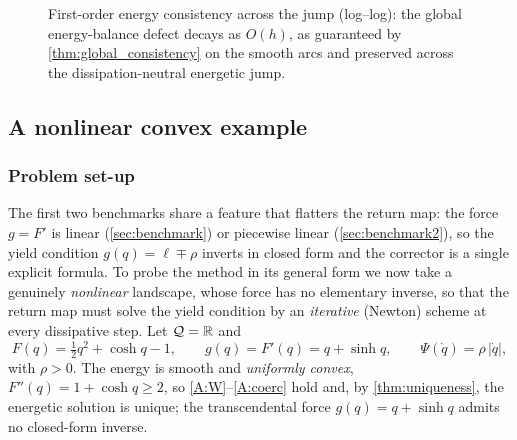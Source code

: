 \begin{figure}[t]
  \centering
  \caption{First-order energy consistency across the jump (log--log):
  the global energy-balance defect decays as $O(h)$, as guaranteed by
  \cref{thm:global_consistency} on the smooth arcs and preserved across
  the dissipation-neutral energetic jump.}
  \label{fig:conv2_energy}
\end{figure}

\subsection{A nonlinear convex example}\label{sec:benchmark3}

\subsubsection{Problem set-up}\label{sec:setup3}

The first two benchmarks share a feature that flatters the return map:
the force $g=F'$ is linear (\cref{sec:benchmark}) or piecewise linear
(\cref{sec:benchmark2}), so the yield condition $g(q)=\ell\mp\rho$
inverts in closed form and the corrector is a single explicit formula.
To probe the method in its general form we now take a genuinely
\emph{nonlinear} landscape, whose force has no elementary inverse, so
that the return map must solve the yield condition by an
\emph{iterative} (Newton) scheme at every dissipative step. Let
$\mathcal{Q}=\mathbb{R}$ and
\begin{equation}\label{eq:benchmark3}
  F(q)=\tfrac12 q^2+\cosh q-1,\qquad
  g(q)=F'(q)=q+\sinh q,\qquad
  \Psi(\dot q)=\rho\,|\dot q|,
\end{equation}
with $\rho>0$. The energy is smooth and \emph{uniformly convex},
$F''(q)=1+\cosh q\ge2$, so \ref{A:W}--\ref{A:coerc} hold and, by
\cref{thm:uniqueness}, the energetic solution is unique; the
transcendental force $g(q)=q+\sinh q$ admits no closed-form inverse.

